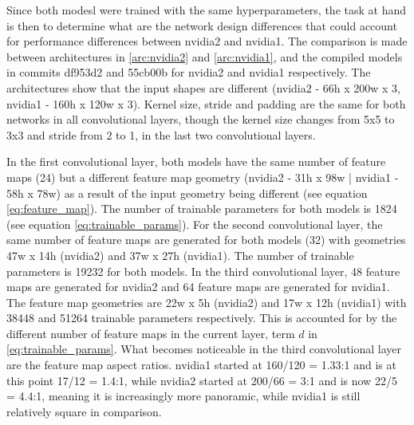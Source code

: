 

Since both modesl were trained with the same hyperparameters, the task at hand is then to determine what are the network design differences that could account for performance differences between nvidia2 and nvidia1. The comparison is made between architectures in \ref{arc:nvidia2} and \ref{arc:nvidia1}, and the compiled models in commits df953d2 and 55cb00b for nvidia2 and nvidia1 respectively. The architectures show that the input shapes are different (nvidia2 - 66h x 200w x 3, nvidia1 - 160h x 120w x 3). Kernel size, stride and padding are the same for both networks in all convolutional layers, though the kernel size changes from 5x5 to 3x3 and stride from 2 to 1, in the last two convolutional layers.   
  
In the first convolutional layer, both models have the same number of feature maps (24) but a different feature map geometry (nvidia2 - 31h x 98w | nvidia1 - 58h x 78w) as a result of the input geometry being different (see equation \ref{eq:feature_map}). The number of trainable parameters for both models is 1824 (see equation \ref{eq:trainable_params}). For the second convolutional layer, the same number of feature maps are generated for both models (32) with geometries 47w x 14h (nvidia2) and 37w x 27h (nvidia1). The number of trainable parameters is 19232 for both models. In the third convolutional layer, 48 feature maps are generated for nvidia2 and 64 feature maps are generated for nvidia1. The feature map geometries are 22w x 5h (nvidia2) and 17w x 12h (nvidia1) with 38448 and 51264 trainable parameters respectively. This is accounted for by the different number of feature maps in the current layer, term $d$ in \ref{eq:trainable_params}. What becomes noticeable in the third convolutional layer are the feature map aspect ratios. nvidia1 started at 160/120 = 1.33:1 and is at this point 17/12 = 1.4:1, while nvidia2 started at 200/66 = 3:1 and is now 22/5 = 4.4:1, meaning it is increasingly more panoramic, while nvidia1 is still relatively square in comparison.  
 
